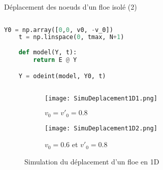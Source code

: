 \begin{frame}[fragile]{Déplacement des noeuds d’un floe isolé (2)}

    \begin{columns}[onlytextwidth]

        \begin{column}{0.5\textwidth}
            \begin{lstlisting}[language=Python,caption=Code de simulation]
    Y0 = np.array([0,0, v0, -v_0])
    t = np.linspace(0, tmax, N+1)
    
    def model(Y, t):
        return E @ Y

    Y = odeint(model, Y0, t)
            \end{lstlisting}
        \end{column}

    \end{columns}
    

    
    \begin{figure}[!h]
        \centering
        \begin{subfigure}[t]{0.45\textwidth}
            \centering
            \texttt{[image: SimuDeplacement1D1.png]}
            \caption{$v_0=v'_0 = 0.8$}
        \end{subfigure}
        \begin{subfigure}[t]{0.45\textwidth}
            \centering
            \texttt{[image: SimuDeplacement1D2.png]}
            \caption{$v_0= 0.6$ et $v'_0 = 0.8$}
        \end{subfigure}    
        \caption{Simulation du déplacement d'un floe en 1D}
    \end{figure}

\end{frame}




